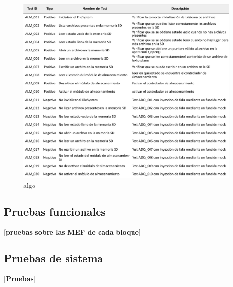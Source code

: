 \begin{figure}[ht]
	\centering
	\includegraphics[width=\textwidth]{./Figures/TestSD.pdf}
	\caption{algo}
	\label{fig:IPfC}
\end{figure}

\subsection{Pruebas funcionales}
\label{subsec:pruebasFuncionales}


[\textbf{pruebas sobre las MEF de cada bloque}]

\subsection{Pruebas de sistema}
\label{subsec:pruebasSistema}

[\textbf{Pruebas}]